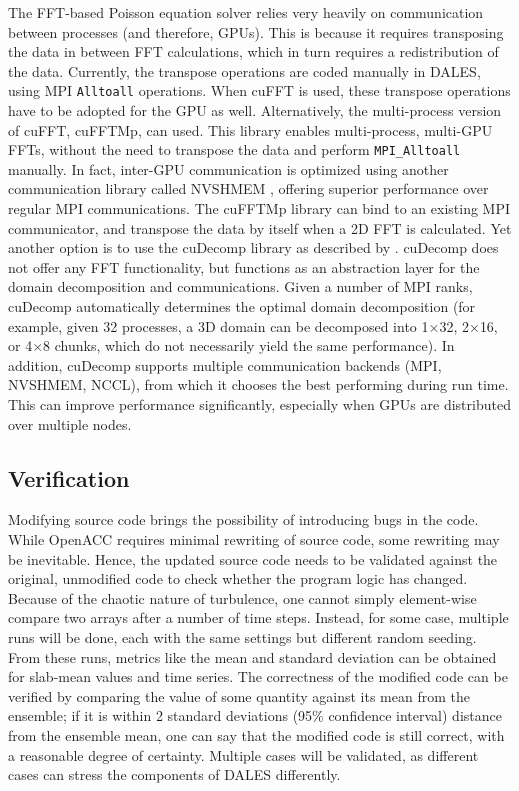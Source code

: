 The FFT-based Poisson equation solver relies very heavily on communication between processes (and therefore, GPUs). This is because it requires transposing the data in between FFT calculations, which in turn requires a redistribution of the data. Currently, the transpose operations are coded manually in DALES, using MPI \texttt{Alltoall} operations. When cuFFT is used, these transpose operations have to be adopted for the GPU as well. Alternatively, the multi-process version of cuFFT, cuFFTMp, can used. This library enables multi-process, multi-GPU FFTs, without the need to transpose the data and perform \texttt{MPI\_Alltoall} manually. In fact, inter-GPU communication is optimized using another communication library called NVSHMEM \citep{nvidiadeveloperNVSHMEM}, offering superior performance over regular MPI communications. The cuFFTMp library can bind to an existing MPI communicator, and transpose the data by itself when a 2D FFT is calculated. Yet another option is to use the cuDecomp library as described by \citet{romeroDistributedmemorySimulationsTurbulent2022}. cuDecomp does not offer any FFT functionality, but functions as an abstraction layer for the domain decomposition and communications. Given a number of MPI ranks, cuDecomp automatically determines the optimal domain decomposition (for example, given 32 processes, a 3D domain can be decomposed into 1$\times$32, 2$\times$16, or 4$\times$8 chunks, which do not necessarily yield the same performance). In addition, cuDecomp supports multiple communication backends (MPI, NVSHMEM, NCCL), from which it chooses the best performing during run time. This can improve performance significantly, especially when GPUs are distributed over multiple nodes. 

\subsection{Verification}
Modifying source code brings the possibility of introducing bugs in the code. While OpenACC requires minimal rewriting of source code, some rewriting may be inevitable. Hence, the updated source code needs to be validated against the original, unmodified code to check whether the program logic has changed. Because of the chaotic nature of turbulence, one cannot simply element-wise compare two arrays after a number of time steps. Instead, for some case, multiple runs will be done, each with the same settings but different random seeding. From these runs, metrics like the mean and standard deviation can be obtained for slab-mean values and time series. The correctness of the modified code can be verified by comparing the value of some quantity against its mean from the ensemble; if it is within 2 standard deviations (95\% confidence interval) distance from the ensemble mean, one can say that the modified code is still correct, with a reasonable degree of certainty. Multiple cases will be validated, as different cases can stress the components of DALES differently. 